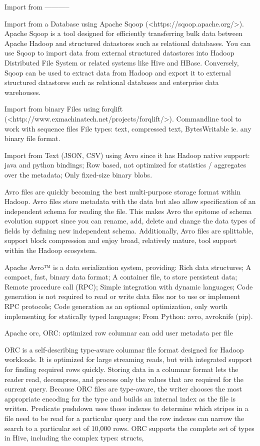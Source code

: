 Import from
-----------

Import from a Database using Apache Sqoop (<https://sqoop.apache.org/>). 
Apache Sqoop is a tool designed for efficiently transferring bulk data between Apache Hadoop and structured
datastores such as relational databases. You can use Sqoop to import data from external structured datastores
into Hadoop Distributed File System or related systems like Hive and HBase. Conversely, Sqoop can be used to
extract data from Hadoop and export it to external structured datastores such as relational databases and
enterprise data warehouses. %

Import from binary Files using forqlift (<http://www.exmachinatech.net/projects/forqlift/>).
Commandline tool to work with sequence files File types: text, compressed text, BytesWritable ie. any binary
file format. %


Import from Text (JSON, CSV) using Avro since it has Hadoop native support: java and python bindings; Row based,
not optimized for statistics / aggregates over the metadata; Only fixed-size binary blobs.

Avro files are quickly becoming the best multi-purpose storage format within Hadoop. Avro files store
metadata with the data but also allow specification of an independent schema for reading the file. This
makes Avro the epitome of schema evolution support since you can rename, add, delete and change the data
types of fields by defining new independent schema. Additionally, Avro files are splittable, support
block compression and enjoy broad, relatively mature, tool support within the Hadoop ecosystem.

Apache Avro™ is a data serialization system, providing: Rich data structures; A compact, fast, binary
data format; A container file, to store persistent data; Remote procedure call (RPC); Simple integration
with dynamic languages; Code generation is not required to read or write data files nor to use or implement
RPC protocols; Code generation as an optional optimization, only worth implementing for statically
typed languages; From Python: avro, avroknife (pip).


Apache orc, ORC: optimized row columnar can add user metadata per file

ORC is a self-describing type-aware columnar file format designed for Hadoop workloads. It is optimized
for large streaming reads, but with integrated support for finding required rows quickly. Storing data
in a columnar format lets the reader read, decompress, and process only the values that are required
for the current query. Because ORC files are type-aware, the writer chooses the most appropriate encoding
for the type and builds an internal index as the file is written. Predicate pushdown uses those indexes
to determine which stripes in a file need to be read for a particular query and the row indexes can
narrow the search to a particular set of 10,000 rows. ORC supports the complete set of types in Hive,
including the complex types: structs,


